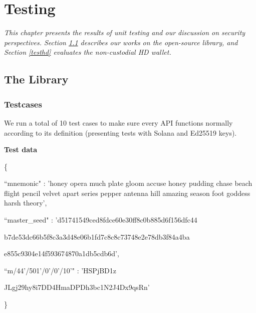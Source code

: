 \chapter{Testing}
\label{chap:testing}
\textit{This chapter presents the results of unit testing and our discussion on security perspectives. Section \ref{testlib} describes our works on the open-source library, and Section \ref{testhd} evaluates the non-custodial HD wallet.}

\minitoc

\section{The Library}
\label{testlib}
\subsection{Testcases}

We run a total of 10 test cases to make sure every API functions normally according to its definition (presenting tests with Solana and Ed25519 keys). 

\bigskip
{\textbf{Test data}}

\begin{framed}
    \hspace*{13mm}        \{ \par
    \hspace*{13mm}        ``mnemonic" : 'honey opera much plate gloom accuse honey pudding chase beach flight pencil velvet apart series pepper antenna hill amazing season foot goddess harsh theory',    \par
    \hspace*{13mm}        ``master\_seed" : 'd51741549ced8fdce60e30ff8c0b885d6f156dfc44 \par
    \hspace*{27mm}         b7de53dc66b5f8c3a3d48e06b1fd7c8c8c73748e2e78db3f84a4ba \par
    \hspace*{27mm}         e855c9304e14f593674870a1db5cdb6d',    \par
    \hspace*{13mm}        ``m/44'/501'/0'/0'/10'" : 'HSPjBD1z \par
    \hspace*{37mm}        JLgj29hy8i7DD4HmaDPDh3bc1N2J4Dx9qsRn' \par
    \hspace*{13mm}              \} \par
    \end{framed}

